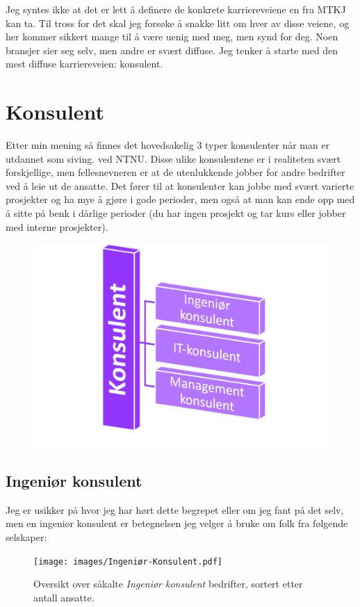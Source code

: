 Jeg syntes ikke at det er lett å definere de konkrete karriereveiene en fra MTKJ kan ta. Til tross for det skal jeg forsøke å snakke litt om hver av disse veiene, og her kommer sikkert mange til å være uenig med meg, men synd for deg. Noen bransjer sier seg selv, men andre er svært diffuse. Jeg tenker å starte med den mest diffuse karriereveien: konsulent. 

\section{Konsulent}

Etter min mening så finnes det hovedsakelig 3 typer konsulenter når man er utdannet som siving. ved NTNU. Disse ulike konsulentene er i realiteten svært forskjellige, men fellesnevneren er at de utenlukkende jobber for andre bedrifter ved å leie ut de ansatte. Det fører til at konsulenter kan jobbe med svært varierte prosjekter og ha mye å gjøre i gode perioder, men også at man kan ende opp med å sitte på benk i dårlige perioder (du har ingen prosjekt og tar kurs eller jobber med interne prosjekter).

\begin{figure}[H]
    \centering
    \includegraphics[width=0.5\linewidth]{images/Konsulent.pdf}
\end{figure}



\subsection{Ingeniør konsulent}

Jeg er usikker på hvor jeg har hørt dette begrepet eller om jeg fant på det selv, men en ingeniør konsulent er betegnelsen jeg velger å bruke om folk fra følgende selskaper:

\begin{figure}[H]
    \centering
    \texttt{[image: images/Ingeniør-Konsulent.pdf]}
    \caption{Oversikt over såkalte \textit{Ingeniør konsulent} bedrifter, sortert etter antall ansatte.}
    \label{fig:ingeniør-konsulent}
\end{figure}

